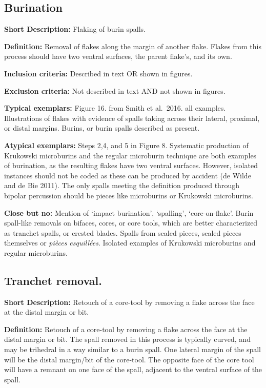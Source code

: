 \documentclass[
]{article}
\begin{document}
\subsection{Burination}\label{burination}

\textbf{Short Description:} Flaking of burin spalls.

\textbf{Definition:} Removal of flakes along the margin of another
flake. Flakes from this process should have two ventral surfaces, the
parent flake's, and its own.

\textbf{Inclusion criteria:} Described in text OR shown in figures.

\textbf{Exclusion criteria:} Not described in text AND not shown in
figures.

\textbf{Typical exemplars:} Figure 16. from Smith et al.~2016. all
examples. Illustrations of flakes with evidence of spalls taking across
their lateral, proximal, or distal margins. Burins, or burin spalls
described as present.

\textbf{Atypical exemplars:} Steps 2,4, and 5 in Figure 8. Systematic
production of Krukowski microburins and the regular microburin technique
are both examples of burination, as the resulting flakes have two
ventral surfaces. However, isolated instances should not be coded as
these can be produced by accident (de Wilde and de Bie 2011). The only
spalls meeting the definition produced through bipolar percussion should
be pieces like microburins or Krukowski microburins.

\textbf{Close but no:} Mention of `impact burination', `spalling',
`core-on-flake'. Burin spall-like removals on bifaces, cores, or core
tools, which are better characterized as tranchet spalls, or crested
blades. Spalls from scaled pieces, scaled pieces themselves or
\emph{pièces esquillées}. Isolated examples of Krukowski microburins and
regular microburins.

\subsection{Tranchet removal.}\label{tranchet-removal.}

\textbf{Short Description:} Retouch of a core-tool by removing a flake
across the face at the distal margin or bit.

\textbf{Definition:} Retouch of a core-tool by removing a flake across
the face at the distal margin or bit. The spall removed in this process
is typically curved, and may be trihedral in a way similar to a burin
spall. One lateral margin of the spall will be the distal margin/bit of
the core-tool. The opposite face of the core tool will have a remnant on
one face of the spall, adjacent to the ventral surface of the spall.
\end{document}
